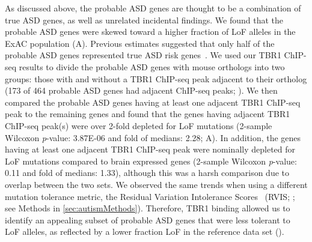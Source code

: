 As discussed above, the probable ASD genes are thought to be a
combination of true ASD genes, as well as unrelated incidental findings.
We found that the probable ASD genes were skewed toward a higher
fraction of LoF alleles in the ExAC population (A). Previous
estimates suggested that only half of the probable ASD genes represented
true ASD risk genes~\citep{Willsey:2013bd}. We used our TBR1 ChIP-seq
results to divide the probable ASD genes with mouse orthologs into two
groups: those with and without a TBR1 ChIP-seq peak adjacent to their
ortholog (173 of 464 probable ASD genes had adjacent ChIP-seq peaks;
). We then compared the probable ASD genes having
at least one adjacent TBR1 ChIP-seq peak to the remaining genes and
found that the genes having adjacent TBR1 ChIP-seq peak(s) were over
2-fold depleted for LoF mutations (2-sample Wilcoxon \emph{p}-value:
3.87E-06 and fold of medians: 2.28; A). In addition, the genes
having at least one adjacent TBR1 ChIP-seq peak were nominally depleted
for LoF mutations compared to brain expressed genes (2-sample Wilcoxon
\emph{p}-value: 0.11 and fold of medians: 1.33), although this was a
harsh comparison due to overlap between the two sets. We observed the
same trends when using a different mutation tolerance metric, the
Residual Variation Intolerance Scores~\citep{Petrovski:2013bp} (RVIS;
; see Methods in \ref{sec:autismMethods}). Therefore, TBR1 binding allowed us
to identify an appealing subset of probable ASD genes that were less
tolerant to LoF alleles, as reflected by a lower fraction LoF in the
reference data set ().

